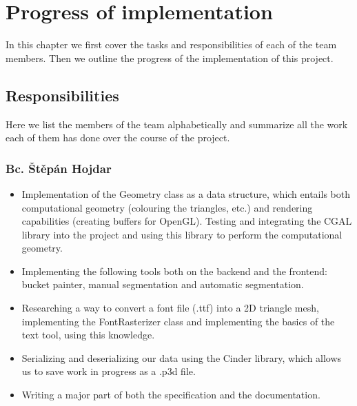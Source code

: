 \chapter{Progress of implementation}

In this chapter we first cover the tasks and responsibilities of each of the team members. Then we outline the progress of the implementation of this project.

\section{Responsibilities}
\label{sec:responsibilities}

Here we list the members of the team alphabetically and summarize all the work each of them has done over the course of the project.

\subsection{Bc. Štěpán Hojdar}
\begin{itemize}
\item Implementation of the Geometry class as a data structure, which entails both computational geometry (colouring the triangles, etc.) and rendering capabilities (creating buffers for OpenGL). Testing and integrating the CGAL library into the project and using this library to perform the computational geometry.
\item Implementing the following tools both on the backend and the frontend: bucket painter, manual segmentation and automatic segmentation.
\item Researching a way to convert a font file (.ttf) into a 2D triangle mesh, implementing the FontRasterizer class and implementing the basics of the text tool, using this knowledge.
\item Serializing and deserializing our data using the Cinder library, which allows us to save work in progress as a .p3d file.
\item Writing a major part of both the specification and the documentation.
\end{itemize}

